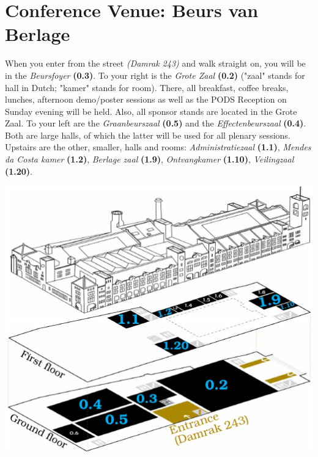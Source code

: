 \clearpage
\ifodd\value{page}\hbox{}\newpage\fi
\section*{Conference Venue: Beurs van Berlage}

When you enter from the street \emph{(Damrak 243)} and walk straight on, you will be in the \emph{Beursfoyer} \textbf{(0.3)}. To your right is the \emph{Grote Zaal} \textbf{(0.2)} ("zaal" stands for hall in Dutch; "kamer" stands for room). There, all breakfast, coffee breaks, lunches, afternoon demo/poster sessions as well as the PODS Reception on Sunday evening will be held. Also, all sponsor stands are located in the Grote Zaal. To your left are the \emph{Graanbeurszaal} \textbf{(0.5)} and the \emph{Effectenbeurszaal} \textbf{(0.4)}. Both are large halls, of which the latter will be used for all plenary sessions. Upstairs are the other, smaller, halls and rooms: \emph{Administratiezaal} \textbf{(1.1)}, \emph{Mendes da Costa kamer} \textbf{(1.2)}, \emph{Berlage zaal} \textbf{(1.9)}, \emph{Ontvangkamer} \textbf{(1.10)}, \emph{Veilingzaal} \textbf{(1.20)}.

\includegraphics[width=\textwidth]{images/BvB-plan-3D-85mm-x-1__mm.pdf}%



